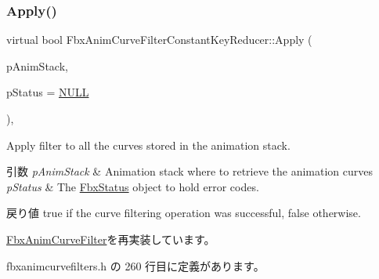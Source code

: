 \subsubsection{\texorpdfstring{Apply()}{Apply()}\hspace{0.1cm}{\footnotesize\ttfamily [1/5]}}
{\footnotesize\ttfamily virtual bool Fbx\+Anim\+Curve\+Filter\+Constant\+Key\+Reducer\+::\+Apply (\begin{DoxyParamCaption}\item[{\hyperlink{class_fbx_anim_stack}{Fbx\+Anim\+Stack} $\ast$}]{p\+Anim\+Stack,  }\item[{\hyperlink{class_fbx_status}{Fbx\+Status} $\ast$}]{p\+Status = {\ttfamily \hyperlink{fbxarch_8h_a070d2ce7b6bb7e5c05602aa8c308d0c4}{N\+U\+LL}} }\end{DoxyParamCaption})\hspace{0.3cm}{\ttfamily [inline]}, {\ttfamily [virtual]}}

Apply filter to all the curves stored in the animation stack. 
\begin{DoxyParams}{引数}
{\em p\+Anim\+Stack} & Animation stack where to retrieve the animation curves \\
\hline
{\em p\+Status} & The \hyperlink{class_fbx_status}{Fbx\+Status} object to hold error codes. \\
\hline
\end{DoxyParams}
\begin{DoxyReturn}{戻り値}
{\ttfamily true} if the curve filtering operation was successful, {\ttfamily false} otherwise. 
\end{DoxyReturn}


\hyperlink{class_fbx_anim_curve_filter_aef3900e6180e05661c27ee484ae939c3}{Fbx\+Anim\+Curve\+Filter}を再実装しています。



 fbxanimcurvefilters.\+h の 260 行目に定義があります。

\mbox{\label{class_fbx_anim_curve_filter_constant_key_reducer_a08bf131629e3e1bc798a342cd479c2e4}} 
